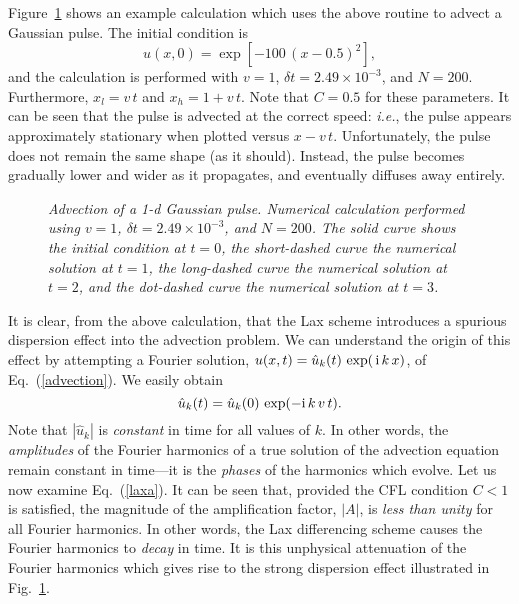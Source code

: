 Figure~\ref{decay} shows an example calculation which uses the above routine to
advect a Gaussian pulse. The initial condition is
\begin{equation}\label{initcn}
u(x,0) = \exp[-100\,(x-0.5)^2],
\end{equation}
and the calculation is performed with $v=1$, $\delta t = 2.49\times 10^{-3}$, and $N=200$.
Furthermore, $x_l = v\,t$ and $x_h = 1 + v\,t$.
Note that $C=0.5$ for these parameters. It can be
seen that the pulse is advected at the correct speed: {\em i.e.}, the
pulse  appears approximately stationary when  plotted versus $x-v\,t$. 
Unfortunately, the pulse does not remain the same shape (as it should). Instead, the
pulse becomes gradually lower and wider as it propagates, and eventually
diffuses away entirely.

\begin{figure}
\epsfysize=3in
\centerline{}
\caption{\em Advection of a 1-d Gaussian pulse.
Numerical  calculation performed using
$v=1$, $\delta t = 2.49\times 10^{-3}$, and $N=200$.  The
solid curve shows the initial condition at $t=0$, the short-dashed curve  the numerical solution
at $t=1$, the long-dashed curve  the numerical solution
at $t=2$, and the dot-dashed  curve  the numerical solution at 
$t=3$. }\label{decay}
\end{figure}

It is clear, from the above calculation, that the Lax scheme introduces a spurious
dispersion effect into the advection problem. We can understand the origin
of this effect by attempting a Fourier solution, $u(x,t)=\hat{u}_k(t)\,\exp(\,{\rm i}\,k\,x)$,
of Eq.~(\ref{advection}). We easily obtain
\begin{equation}
\hat{u}_k(t) = \hat{u}_k(0)\,\exp(-{\rm i}\,k\,v\,t).
\end{equation}
Note that $|\hat{u}_k|$ is {\em constant} in time for all values of $k$. In other words, the
{\em amplitudes} of the Fourier harmonics of a true solution of the advection equation
remain constant in time---it is the {\em phases} of the harmonics which
evolve. Let us now examine Eq.~(\ref{laxa}). It can be seen that, provided  the CFL condition
$C<1$ is satisfied,  the magnitude of the amplification factor, $|A|$,
is {\em less than unity}  for all Fourier harmonics. In other words,
the Lax differencing scheme causes the Fourier harmonics to {\em decay} in time. It is this unphysical
attenuation of the Fourier harmonics which gives rise to the strong dispersion effect
illustrated in Fig.~\ref{decay}.

